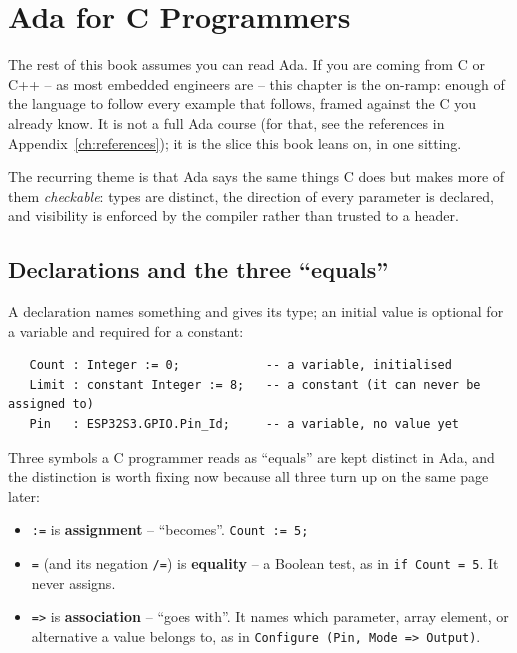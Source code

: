 \chapter{Ada for C Programmers}
\label{ch:ada-primer}

The rest of this book assumes you can read Ada. If you are coming from C or C++ --
as most embedded engineers are -- this chapter is the on-ramp: enough of the
language to follow every example that follows, framed against the C you already
know. It is not a full Ada course (for that, see the references in
Appendix~\ref{ch:references}); it is the slice this book leans on, in one sitting.

The recurring theme is that Ada says the same things C does but makes more of them
\emph{checkable}: types are distinct, the direction of every parameter is declared,
and visibility is enforced by the compiler rather than trusted to a header.

\section{Declarations and the three ``equals''}

A declaration names something and gives its type; an initial value is optional for
a variable and required for a constant:

\begin{lstlisting}
   Count : Integer := 0;            -- a variable, initialised
   Limit : constant Integer := 8;   -- a constant (it can never be assigned to)
   Pin   : ESP32S3.GPIO.Pin_Id;     -- a variable, no value yet
\end{lstlisting}

Three symbols a C programmer reads as ``equals'' are kept distinct in Ada, and the
distinction is worth fixing now because all three turn up on the same page later:

\begin{itemize}
  \item \texttt{:=} is \textbf{assignment} -- ``becomes''. \texttt{Count := 5;}
  \item \texttt{=} (and its negation \texttt{/=}) is \textbf{equality} -- a Boolean
        test, as in \texttt{if Count = 5}. It never assigns.
  \item \texttt{=>} is \textbf{association} -- ``goes with''. It names which
        parameter, array element, or alternative a value belongs to, as in
        \texttt{Configure (Pin, Mode => Output)}.
\end{itemize}

